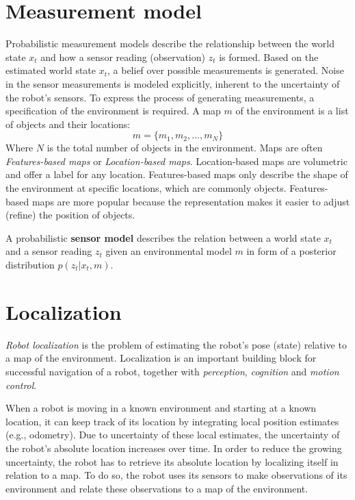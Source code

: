 		\section{Measurement model}
		\label{sec:measurement_model}
Probabilistic measurement models describe the relationship between the world state $x_t$ and how a sensor reading (observation) $z_t$ is formed.
Based on the estimated world state $x_t$, a belief over possible measurements is generated.
Noise in the sensor measurements is modeled explicitly, inherent to the uncertainty of the robot's sensors.
To express the process of generating measurements, a specification of the environment is required.
A map $m$ of the environment is a list of objects and their locations:
\begin{equation}
m = \{m_1, m_2, \hdots, m_N\}
\end{equation}
Where $N$ is the total number of objects in the environment.
Maps are often \textit{Features-based maps} or \textit{Location-based maps}.
Location-based maps are volumetric and offer a label for any location.
Features-based maps only describe the shape of the environment at specific locations, which are commonly objects.
Features-based maps are more popular because the representation makes it easier to adjust (refine) the position of objects.
\begin{mydef}
A probabilistic \textbf{sensor model} describes the relation between a world state $x_t$ and a sensor reading $z_t$ given an environmental model $m$ in form of a posterior distribution $p (z_t | x_t, m)$.
\end{mydef}


		\section{Localization}
\label{sec:probabilistic-robotics-localization}
\textit{Robot localization} is the problem of estimating the robot's pose (state) relative to a map of the environment.
Localization is an important building block for successful navigation of a robot, together with \textit{perception}, \textit{cognition} and \textit{motion control}.

When a robot is moving in a known environment and starting at a known location, it can keep track of its location by integrating local position estimates (e.g., odometry).
Due to uncertainty of these local estimates, the uncertainty of the robot's absolute location increases over time.
In order to reduce the growing uncertainty, the robot has to retrieve its absolute location by localizing itself in relation to a map.
To do so, the robot uses its sensors to make observations of its environment and relate these observations to a map of the environment.

